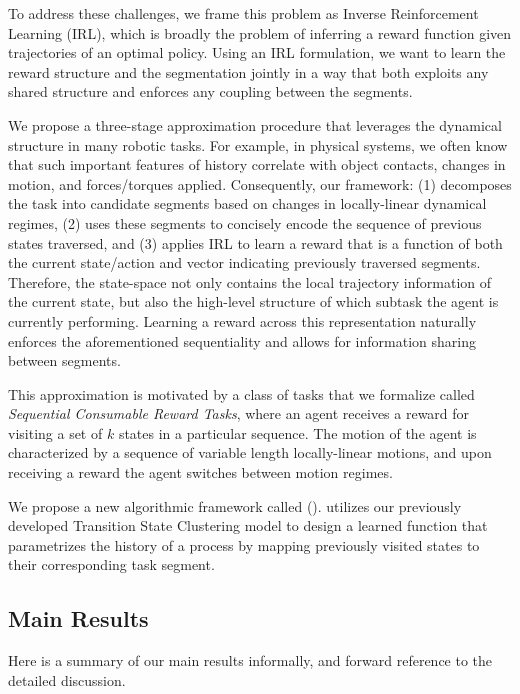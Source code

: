 To address these challenges, we frame this problem as Inverse Reinforcement Learning (IRL), which is broadly the problem of inferring a reward function given trajectories of an optimal policy.
Using an IRL formulation, we want to learn the reward structure and the segmentation jointly in a way that both exploits any shared structure and enforces any coupling between the segments.


We propose a three-stage approximation procedure that leverages the dynamical structure in many robotic tasks.
For example, in physical systems, we often know that such important features of history correlate with object contacts, changes in motion, and forces/torques applied.
Consequently, our framework: (1) decomposes the task into candidate segments based on changes in locally-linear dynamical regimes, (2) uses these segments to concisely encode the sequence of previous states traversed, and (3) applies IRL to learn a reward that is a function of both the current state/action and vector indicating previously traversed segments.  
Therefore, the state-space not only contains the local trajectory information of the current state, but also the high-level structure of which subtask the agent is currently performing.
Learning a reward across this representation naturally enforces the aforementioned sequentiality and allows for information sharing between segments.

This approximation is motivated by a class of tasks that we formalize called \emph{Sequential Consumable Reward Tasks}, where an agent receives a reward for visiting a set of $k$ states in a particular sequence.
The motion of the agent is characterized by a sequence of variable length locally-linear motions, and upon receiving a reward the agent switches between motion regimes.


We propose a new algorithmic framework called \tshfull (\tsh).
\tsh utilizes our previously developed Transition State Clustering model to design a learned function that parametrizes the history of a process by mapping previously visited states to their corresponding task segment.

\subsection{Main Results}
Here is a summary of our main results informally, and forward reference to the detailed discussion.

\vspace{0.5em}

